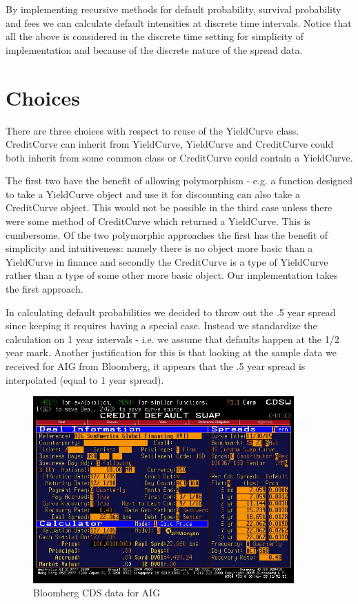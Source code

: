 By implementing recursive methods for default probability, survival
probability and fees we can calculate default intensities at
discrete time intervals.  Notice that all the above is considered in
the discrete time setting for simplicity of implementation and
because of the discrete nature of the spread data.

\section{Choices}

There are three choices with respect to reuse of the YieldCurve
class.  CreditCurve can inherit from YieldCurve, YieldCurve and
CreditCurve could both inherit from some common class or CreditCurve
could contain a YieldCurve.

The first two have the benefit of allowing polymorphism - e.g. a
function designed to take a YieldCurve object and use it for
discounting can also take a CreditCurve object.  This would not be
possible in the third case unless there were some method of
CreditCurve which returned a YieldCurve.  This is cumbersome.  Of
the two polymorphic approaches the first has the benefit of
simplicity and intuitiveness: namely there is no object more basic
than a YieldCurve in finance and secondly the CreditCurve is a type
of YieldCurve rather than a type of some other more basic object.
Our implementation takes the first approach.

In calculating default probabilities we decided to throw out the .5
year spread since keeping it requires having a special case. Instead
we standardize the calculation on 1 year intervals - i.e. we assume
that defaults happen at the 1/2 year mark.  Another justification
for this is that looking at the sample data we received for AIG from
Bloomberg, it appears that the .5 year spread is interpolated (equal
to 1 year spread).


\begin{figure}
\begin{center}
        \includegraphics[width=10cm]{CDSW_AIG.jpg}
        \caption{Bloomberg CDS data for AIG}
\end{center}
\end{figure}

